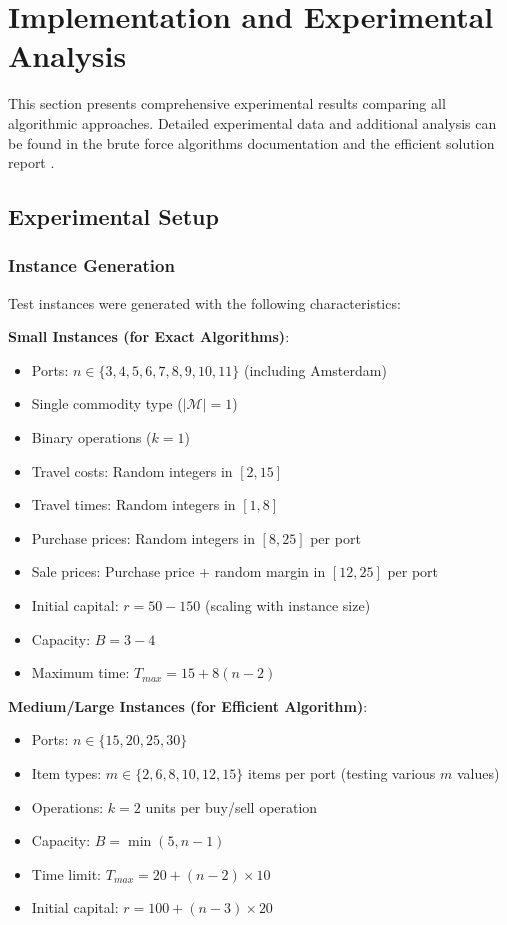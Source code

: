 \documentclass[12pt]{article}
\begin{document}
\section{Implementation and Experimental Analysis}
\label{sec:experimental}

This section presents comprehensive experimental results comparing all algorithmic approaches. Detailed experimental data and additional analysis can be found in the brute force algorithms documentation \cite{brute_force_doc} and the efficient solution report \cite{efficient_doc}.

\subsection{Experimental Setup}

\subsubsection{Instance Generation}

Test instances were generated with the following characteristics:

\textbf{Small Instances (for Exact Algorithms)}:
\begin{itemize}
    \item Ports: $n \in \{3, 4, 5, 6, 7, 8, 9, 10, 11\}$ (including Amsterdam)
    \item Single commodity type ($|\mathcal{M}| = 1$)
    \item Binary operations ($k = 1$)
    \item Travel costs: Random integers in $[2, 15]$
    \item Travel times: Random integers in $[1, 8]$
    \item Purchase prices: Random integers in $[8, 25]$ per port
    \item Sale prices: Purchase price + random margin in $[12, 25]$ per port
    \item Initial capital: $r = 50-150$ (scaling with instance size)
    \item Capacity: $B = 3-4$
    \item Maximum time: $T_{max} = 15 + 8(n-2)$
\end{itemize}

\textbf{Medium/Large Instances (for Efficient Algorithm)}:
\begin{itemize}
    \item Ports: $n \in \{15, 20, 25, 30\}$
    \item Item types: $m \in \{2, 6, 8, 10, 12, 15\}$ items per port (testing various $m$ values)
    \item Operations: $k = 2$ units per buy/sell operation
    \item Capacity: $B = \min(5, n-1)$
    \item Time limit: $T_{max} = 20 + (n-2) \times 10$
    \item Initial capital: $r = 100 + (n-3) \times 20$
\end{itemize}
\end{document}
